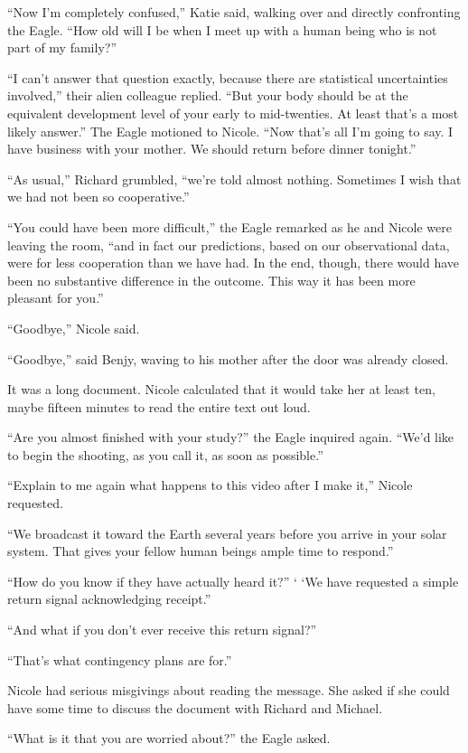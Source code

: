 \documentclass[]{article}
\begin{document}
{“Now I’m completely confused,” Katie said, walking over and directly confronting the Eagle. “How old will I be when I meet up with a human being who is not part of my family?”

“I can’t answer that question exactly, because there are statistical uncertainties involved,” their alien colleague replied. “But your body should be at the equivalent development level of your early to mid-twenties. At least that’s a most likely answer.” The Eagle motioned to Nicole. “Now that’s all I’m going to say. I have business with your mother. We should return before dinner tonight.”

“As usual,” Richard grumbled, “we’re told almost nothing. Sometimes I wish that we had not been so cooperative.”

“You could have been more difficult,” the Eagle remarked as he and Nicole were leaving the room, “and in fact our predictions, based on our observational data, were for less cooperation than we have had. In the end, though, there would have been no substantive difference in the outcome. This way it has been more pleasant for you.”

“Goodbye,” Nicole said.

“Goodbye,” said Benjy, waving to his mother after the door was already closed.

It was a long document. Nicole calculated that it would take her at least ten, maybe fifteen minutes to read the entire text out loud.

“Are you almost finished with your study?” the Eagle inquired again. “We’d like to begin the shooting, as you call it, as soon as possible.”

“Explain to me again what happens to this video after I make it,” Nicole requested.

“We broadcast it toward the Earth several years before you arrive in your solar system. That gives your fellow human beings ample time to respond.”

“How do you know if they have actually heard it?” ‘ ‘We have requested a simple return signal acknowledging receipt.”

“And what if you don’t ever receive this return signal?”

“That’s what contingency plans are for.”

Nicole had serious misgivings about reading the message. She asked if she could have some time to discuss the document with Richard and Michael.

“What is it that you are worried about?” the Eagle asked.

}
\end{document}
